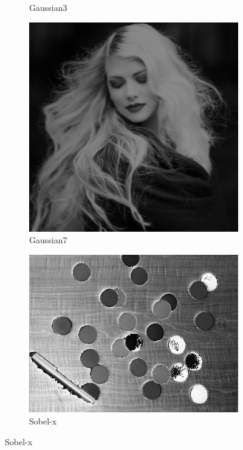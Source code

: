 \documentclass[14pt]{article}
\begin{document}
\begin{figure}[hbt!]
\begin{subfigure}[b]{0.23\linewidth}
			\caption{Gaussian3}
		\end{subfigure}
		\begin{subfigure}[b]{0.23\linewidth}
			\includegraphics[width=\linewidth]{g7.png}
			\caption{Gaussian7}
		\end{subfigure}
		\begin{subfigure}[b]{0.23\linewidth}
			\includegraphics[width=\linewidth]{k6.png}
			\caption{Sobel-x}
		\end{subfigure}

\end{figure}
\end{document}
